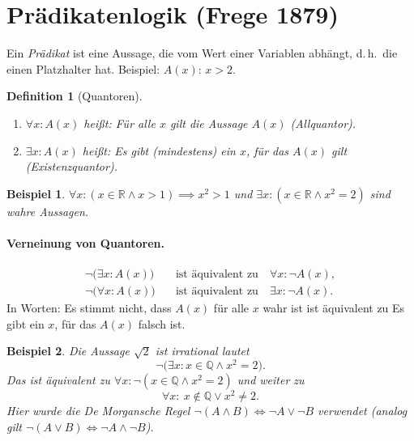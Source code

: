 \documentclass[a4paper]{article}
\theoremstyle{kurzskript}
\newtheorem{definition}[satz]{Definition}
\newtheorem*{bsp}{Beispiel}
\newcommand{\Q}{\mathbb{Q}}
\newcommand{\R}{\mathbb{R}}
\begin{document}
\section{Prädikatenlogik (Frege 1879)}

Ein \emph{Prädikat} ist eine Aussage, die vom Wert einer Variablen abhängt, d.\,h.\ die einen Platzhalter hat. Beispiel: $A(x)$: \glqq$x > 2$\grqq.

\begin{definition}[Quantoren]
\leavevmode
\begin{enumerate}[label=(\alph*)]
  \item $\forall x\colon A(x)$ heißt: \glqq Für alle $x$ gilt die Aussage $A(x)$\grqq{} (\emph{Allquantor}).
  \item $\exists x\colon A(x)$ heißt: \glqq Es gibt (mindestens) ein $x$, für das $A(x)$ gilt\grqq{} (\emph{Existenzquantor}).
\end{enumerate}
\end{definition}

\begin{bsp}
$\forall x\colon (x \in \R \land x > 1) \implies x^2 > 1$ \quad und \quad $\exists x\colon (x \in \R \land x^2 = 2)$ \quad sind wahre Aussagen.
\end{bsp}

\paragraph{Verneinung von Quantoren.}
\begin{align*}
  \neg\bigl(\exists x\colon A(x)\bigr) &\quad\text{ist äquivalent zu}\quad \forall x\colon \neg A(x),\\
  \neg\bigl(\forall x\colon A(x)\bigr) &\quad\text{ist äquivalent zu}\quad \exists x\colon \neg A(x).
\end{align*}
In Worten: \glqq Es stimmt nicht, dass $A(x)$ für alle $x$ wahr ist\grqq{} ist äquivalent zu \glqq Es gibt ein $x$, für das $A(x)$ falsch ist\grqq.

\begin{bsp}
Die Aussage \glqq$\sqrt{2}$ ist irrational\grqq{} lautet
\[
  \neg\bigl(\exists x\colon x \in \Q \land x^2 = 2\bigr).
\]
Das ist äquivalent zu $\forall x\colon \neg(x \in \Q \land x^2 = 2)$ und weiter zu
\[
  \forall x\colon\ x \notin \Q \lor x^2 \neq 2.
\]
Hier wurde die \emph{De Morgansche Regel} $\neg(A \land B) \iff \neg A \lor \neg B$ verwendet (analog gilt $\neg(A \lor B) \iff \neg A \land \neg B$).
\end{bsp}
\end{document}
